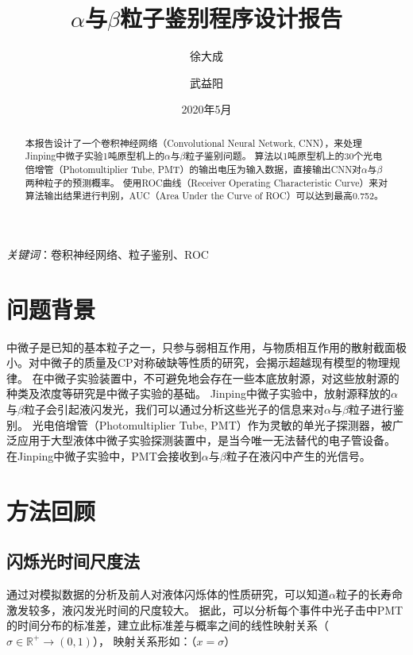 \documentclass{ctexart}
\title{$\alpha$与$\beta$粒子鉴别程序设计报告}
\begin{document}
\author[1]{徐大成}
\author[2]{武益阳}
\date{2020年5月}

\maketitle

\newpage
\tableofcontents

\begin{abstract}
    本报告设计了一个卷积神经网络（Convolutional Neural Network, CNN），来处理Jinping中微子实验1吨原型机上的$\alpha$与$\beta$粒子鉴别问题。
    算法以1吨原型机上的30个光电倍增管（Photomultiplier Tube, PMT）的输出电压为输入数据，直接输出CNN对$\alpha$与$\beta$两种粒子的预测概率。
    使用ROC曲线（Receiver Operating Characteristic Curve）来对算法输出结果进行判别，AUC（Area Under the Curve of ROC）可以达到最高0.752。
\end{abstract}

\textit{关键词}：卷积神经网络、粒子鉴别、ROC

\section{问题背景}
中微子是已知的基本粒子之一，只参与弱相互作用，与物质相互作用的散射截面极小。对中微子的质量及CP对称破缺等性质的研究，会揭示超越现有模型的物理规律。
在中微子实验装置中，不可避免地会存在一些本底放射源，对这些放射源的种类及浓度等研究是中微子实验的基础。
Jinping中微子实验中，放射源释放的$\alpha$与$\beta$粒子会引起液闪发光，我们可以通过分析这些光子的信息来对$\alpha$与$\beta$粒子进行鉴别。
光电倍增管（Photomultiplier Tube, PMT）作为灵敏的单光子探测器，被广泛应用于大型液体中微子实验探测装置中，是当今唯一无法替代的电子管设备。
在Jinping中微子实验中，PMT会接收到$\alpha$与$\beta$粒子在液闪中产生的光信号。

\section{方法回顾}
\subsection{闪烁光时间尺度法}
通过对模拟数据的分析及前人对液体闪烁体的性质研究，可以知道$\alpha$粒子的长寿命激发较多，液闪发光时间的尺度较大。
据此，可以分析每个事件中光子击中PMT的时间分布的标准差，建立此标准差与概率之间的线性映射关系（$\sigma \in \mathbb{R}^{+} \rightarrow (0,1)$），
映射关系形如：（$x = \sigma$）
\end{document}
